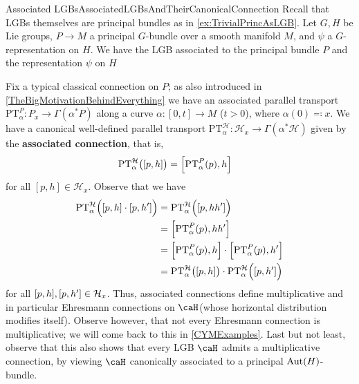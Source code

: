 \documentclass[reqno,a4paper,oneside]{amsart}
\theoremstyle{plain}
\theoremstyle{remark}
\theoremstyle{definition}
\begin{document}
\begin{examples}{Associated LGBs}{AssociatedLGBsAndTheirCanonicalConnection}
Recall that LGBs themselves are principal bundles as in \ref{ex:TrivialPrincAsLGB}. Let $G, H$ be Lie groups, $P \to M$ a principal $G$-bundle over a smooth manifold $M$, and $\psi$ a $G$-representation on $H$. We have the LGB associated to the principal bundle $P$ and the representation $\psi$ on $H$
\begin{center}
\end{center}
Fix a typical classical connection on $P$; as also introduced in \ref{TheBigMotivationBehindEverything} we have an associated parallel transport $\mathrm{PT}_\alpha^P\colon P_x \to \Gamma(\alpha^*P)$ along a curve $\alpha\colon [0, t] \to M$ ($t > 0$), where $\alpha(0) \eqqcolon x$. We have a canonical well-defined parallel transport $\mathrm{PT}_\alpha^\mathcal{H}\colon \mathcal{H}_x \to \Gamma(\alpha^*\mathcal{H})$ given by the \textbf{associated connection}, that is,
\begin{align*}
\mathrm{PT}_\alpha^\mathcal{H}\bigl( [p, h] \bigr)
&=
\mleft[ \mathrm{PT}_\alpha^P(p), h \mright]
\end{align*}
for all $[p, h] \in \mathcal{H}_x$. 
Observe that we have
\begin{align*}
\mathrm{PT}_\alpha^\mathcal{H}\Bigl( [p, h] \cdot \mleft[ p, h^\prime \mright] \Bigr)
&=
\mathrm{PT}_\alpha^\mathcal{H}\Bigl( \mleft[ p, h h^\prime \mright] \Bigr)
\\
&=
\mleft[ \mathrm{PT}_\alpha^P(p), h h^\prime \mright]
\\
&=
\mleft[ \mathrm{PT}_\alpha^P(p), h \mright]
	\cdot \mleft[ \mathrm{PT}_\alpha^P(p), h^\prime \mright]
\\
&=
\mathrm{PT}_\alpha^\mathcal{H}\bigl( [p, h] \bigr)
	\cdot \mathrm{PT}_\alpha^\mathcal{H}\Bigl( \mleft[p, h^\prime\mright] \Bigr)
\end{align*}
for all $[p, h], \mleft[ p, h^\prime \mright] \in \mathcal{H}_x$. Thus, associated connections define multiplicative and in particular Ehresmann connections on $\caH$(whose horizontal distribution modifies itself). Observe however, that not every Ehresmann connection is multiplicative; we will come back to this in \ref{CYMExamples}. {\color{Cred2} Last but not least, observe that this also shows that every LGB $\caH$ admits a multiplicative connection, by viewing $\caH$ canonically associated to a principal ${\rm Aut}(H)$-bundle.}

\end{examples}
\end{document}
